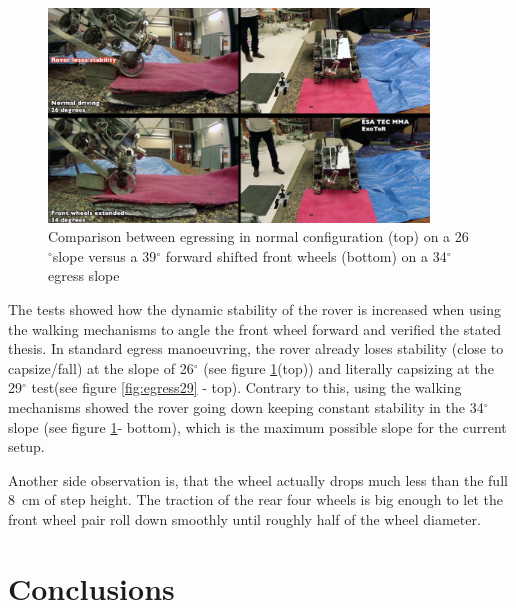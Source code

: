 \documentclass[a4paper,twocolumn]{esapub2005} %
\begin{document}
\begin{figure}[h!] \centering
    \includegraphics[width=0.9\textwidth]{egress34.png}	\caption{Comparison
    between egressing in normal configuration (top)  on a 26$^{\circ}$slope
    versus a 39$^{\circ}$ forward shifted front wheels (bottom) on a 34$^{\circ}$
    egress slope}
    \label{fig:egress34}
\end{figure}

The tests showed how the dynamic stability of the rover is increased when using
the walking mechanisms to angle the front wheel forward and verified the stated
thesis.  In standard egress manoeuvring, the rover already loses stability
(close to capsize/fall) at the slope of 26$^\circ$ (see figure
\ref{fig:egress34}(top)) and literally capsizing at the 29$^\circ$ test(see
figure \ref{fig:egress29} - top). Contrary to this, using the walking mechanisms
showed the rover going down keeping constant stability in the 34$^\circ$ slope
(see figure \ref{fig:egress34}- bottom), which is the maximum possible slope
for the current setup.

Another side observation is, that the wheel actually drops much less than the
full 8~\unit{cm} of step height. The traction of the rear four wheels is big enough to
let the front wheel pair roll down smoothly until roughly half of the wheel
diameter.




\section{Conclusions}
\end{document}
